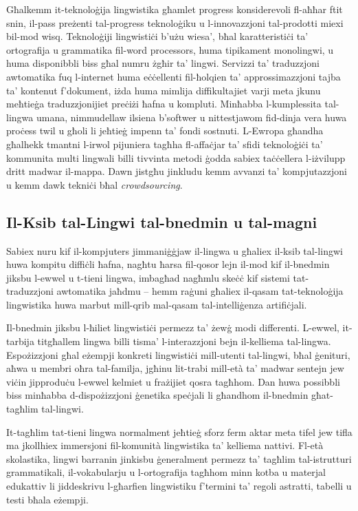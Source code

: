 \begin{multicols}{2}

Għalkemm it-teknoloġija lingwistika għamlet progress konsiderevoli fl-aħħar ftit snin, il-pass preżenti tal-progress teknoloġiku u l-innovazzjoni tal-prodotti miexi bil-mod wisq. Teknoloġiji lingwistiċi b’użu wiesa’, bħal karatteristiċi ta’ ortografija u grammatika fil-word processors, huma tipikament monolingwi, u huma disponibbli biss għal numru żgħir ta’ lingwi. Servizzi ta' traduzzjoni awtomatika fuq l-internet huma eċċellenti fil-ħolqien ta’ approssimazzjoni tajba ta’ kontenut f’dokument, iżda huma mimlija diffikultajiet varji meta jkunu meħtieġa traduzzjonijiet preċiżi ħafna u kompluti. Minħabba l-kumplessita tal-lingwa umana, nimmudellaw ilsiena b’softwer u nittestjawom fid-dinja vera huwa proċess twil u għoli li jeħtieġ impenn ta’ fondi sostnuti. L-Ewropa għandha għalhekk tmantni l-irwol pijuniera tagħha fl-affaċjar ta’ sfidi teknoloġiċi ta’ kommunita multi lingwali billi tivvinta metodi ġodda sabiex taċċellera l-iżvilupp dritt madwar il-mappa. Dawn jistgħu jinkludu kemm avvanzi ta’ kompjutazzjoni u kemm dawk tekniċi bħal \emph{crowdsourcing}.

\subsection{Il-Ksib tal-Lingwi tal-bnedmin u tal-magni}

Sabiex nuru kif il-kompjuters jimmaniġġjaw il-lingwa u għaliex il-ksib tal-lingwi huwa kompitu diffiċli ħafna, nagħtu ħarsa fil-qosor lejn il-mod kif il-bnedmin jiksbu l-ewwel u t-tieni lingwa, imbagħad nagħmlu skeċċ kif sistemi tat-traduzzjoni awtomatika jaħdmu -- hemm raġuni għaliex il-qasam tat-teknoloġija lingwistika huwa marbut mill-qrib mal-qasam tal-intelliġenza artifiċjali.
   
Il-bnedmin jiksbu l-ħiliet lingwistiċi permezz ta’ żewġ modi differenti. L-ewwel, it-tarbija titgħallem lingwa billi tisma’ l-interazzjoni bejn il-kelliema tal-lingwa. Espożizzjoni għal eżempji konkreti lingwistiċi mill-utenti tal-lingwi, bħal ġenituri, aħwa u membri oħra tal-familja, jgħinu lit-trabi mill-età ta’ madwar sentejn jew viċin jipproduċu l-ewwel kelmiet u frażijiet qosra tagħhom. Dan huwa possibbli biss minħabba d-dispożizzjoni ġenetika speċjali li għandhom il-bnedmin għat-tagħlim tal-lingwi.
   
It-tagħlim tat-tieni lingwa normalment jeħtieġ sforz ferm aktar meta tifel jew tifla ma jkollhiex immersjoni fil-komunità lingwistika ta’ kelliema nattivi. Fl-età skolastika, lingwi barranin jinkisbu ġeneralment permezz ta’ tagħlim tal-istrutturi grammatikali, il-vokabularju u l-ortografija tagħhom minn kotba u materjal edukattiv li jiddeskrivu l-għarfien lingwistiku f'termini ta' regoli astratti, tabelli u testi bħala eżempji. 


\end{multicols}

